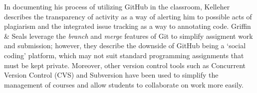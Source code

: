 In documenting his process of utilizing GitHub in the classroom, Kelleher \cite{kelleher2014employing} describes the transparency of activity as a way of alerting him to possible acts of plagiarism and the integrated issue tracking as a way to annotating code. Griffin \& Seals \cite{Griffin:2013:GCJ:2458539.2458551} leverage the \emph{branch} and \emph{merge} features of Git to simplify assigment work and submission; however, they describe the downside of GitHub being a `social coding' platform, which may not suit standard programming assignments that must be kept private. Moreover, other version control tools such as Concurrent Version Control (CVS) \cite{Reid:2005:LDI:1047124.1047441} and Subversion \cite{Clifton:2007:SFS:1227504.1227344} have been used to simplify the management of courses and allow students to collaborate on work more easily.

%

